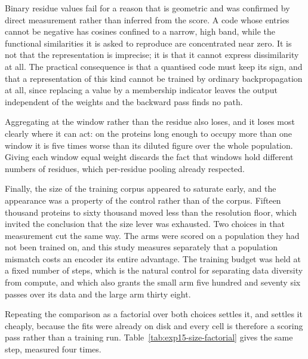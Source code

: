Binary residue values fail for a reason that is geometric and was confirmed by direct
measurement rather than inferred from the score. A code whose entries cannot be
negative has cosines confined to a narrow, high band, while the functional
similarities it is asked to reproduce are concentrated near zero. It is not that the
representation is imprecise; it is that it cannot express dissimilarity at all. The
practical consequence is that a quantised code must keep its sign, and that a
representation of this kind cannot be trained by ordinary backpropagation at all,
since replacing a value by a membership indicator leaves the output independent of
the weights and the backward pass finds no path.

Aggregating at the window rather than the residue also loses, and it loses most
clearly where it can act: on the proteins long enough to occupy more than one window
it is five times worse than its diluted figure over the whole population. Giving each
window equal weight discards the fact that windows hold different numbers of
residues, which per-residue pooling already respected.

Finally, the size of the training corpus appeared to saturate early, and the
appearance was a property of the control rather than of the corpus. Fifteen thousand
proteins to sixty thousand moved less than the resolution floor, which invited the
conclusion that the size lever was exhausted. Two choices in that measurement cut the
same way. The arms were scored on a population they had not been trained on, and this
study measures separately that a population mismatch costs an encoder its entire
advantage. The training budget was held at a fixed number of steps, which is the
natural control for separating data diversity from compute, and which also grants the
small arm five hundred and seventy six passes over its data and the large arm thirty
eight.

Repeating the comparison as a factorial over both choices settles it, and settles it
cheaply, because the fits were already on disk and every cell is therefore a scoring
pass rather than a training run. Table~\ref{tab:exp15-size-factorial} gives the same
step, measured four times.

\begin{table}[htbp]
  \centering
  \caption{The step from fifteen thousand to sixty thousand training proteins,
  measured in all four combinations of scoring population and training budget. Every
  cell is a scoring pass over maps fitted beforehand, through one code path.
  $^{\dagger}$~below the resolution floor of Section~\ref{sec:exp15-floor}.}
  \label{tab:exp15-size-factorial}
  
\end{table}

